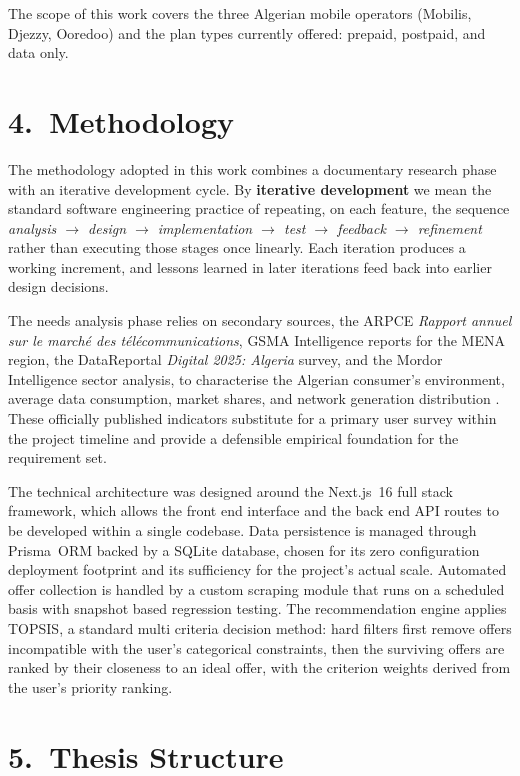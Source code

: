 The scope of this work covers the three Algerian mobile operators (Mobilis, Djezzy, Ooredoo) and the plan types currently offered: prepaid, postpaid, and data only.

\section*{4.~Methodology}

The methodology adopted in this work combines a documentary research phase with an iterative development cycle. By \textbf{iterative development} we mean the standard software engineering practice of repeating, on each feature, the sequence \emph{analysis $\rightarrow$ design $\rightarrow$ implementation $\rightarrow$ test $\rightarrow$ feedback $\rightarrow$ refinement} rather than executing those stages once linearly. Each iteration produces a working increment, and lessons learned in later iterations feed back into earlier design decisions.

The needs analysis phase relies on secondary sources, the ARPCE \textit{Rapport annuel sur le marché des télécommunications}, GSMA Intelligence reports for the MENA region, the DataReportal \textit{Digital 2025: Algeria} survey, and the Mordor Intelligence sector analysis, to characterise the Algerian consumer's environment, average data consumption, market shares, and network generation distribution \parencite{ARPCE2024, GSMA2024, DataReportal2025, Mordor2025}. These officially published indicators substitute for a primary user survey within the project timeline and provide a defensible empirical foundation for the requirement set.

The technical architecture was designed around the Next.js~16 full stack framework, which allows the front end interface and the back end API routes to be developed within a single codebase. Data persistence is managed through Prisma~ORM backed by a SQLite database, chosen for its zero configuration deployment footprint and its sufficiency for the project's actual scale. Automated offer collection is handled by a custom scraping module that runs on a scheduled basis with snapshot based regression testing. The recommendation engine applies TOPSIS, a standard multi criteria decision method: hard filters first remove offers incompatible with the user's categorical constraints, then the surviving offers are ranked by their closeness to an ideal offer, with the criterion weights derived from the user's priority ranking.

\section*{5.~Thesis Structure}

